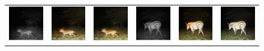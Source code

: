 \begin{figure}[htp!]
\begin{tabularx}{\textwidth}{>{\centering\arraybackslash}X >{\centering\arraybackslash}X >{\centering\arraybackslash}X >{\centering\arraybackslash}X >{\centering\arraybackslash}X >{\centering\arraybackslash}X}
        \includegraphics{gfx/conditional-with-cycle-gan-qual/nir_S2_B06_R1_PICT0128.jpg} & \includegraphics{gfx/conditional-with-cycle-gan-qual/cyclegan_S2_B06_R1_PICT0128_fake.png} & \includegraphics{gfx/conditional-with-cycle-gan-qual/diff_cycle_gan_S2_B06_R1_PICT0128_fake.png} & \includegraphics{gfx/conditional-with-cycle-gan-qual/nir_S2_B06_R1_PICT0279.jpg} & \includegraphics{gfx/conditional-with-cycle-gan-qual/cyclegan_S2_B06_R1_PICT0279_fake.png} & \includegraphics{gfx/conditional-with-cycle-gan-qual/diff_cycle_gan_S2_B06_R1_PICT0279_fake.png} \\

\end{tabularx}
\end{figure}
